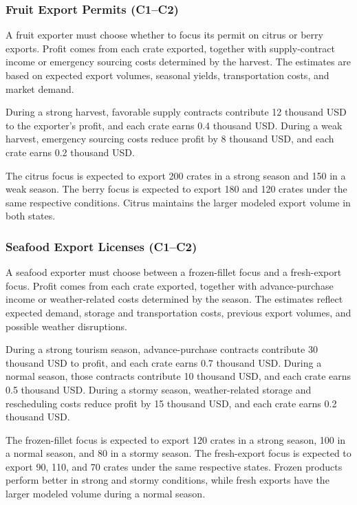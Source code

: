 	\subsubsection{Fruit Export Permits (C1--C2)}
	\label{sec:problem22-fruit-export-permits-c1-c2}
	
	A fruit exporter must choose whether to focus its permit on citrus or berry exports. Profit comes from each crate exported, together with supply-contract income or emergency sourcing costs determined by the harvest. The estimates are based on expected export volumes, seasonal yields, transportation costs, and market demand.
	
	During a strong harvest, favorable supply contracts contribute 12 thousand USD to the exporter’s profit, and each crate earns 0.4 thousand USD. During a weak harvest, emergency sourcing costs reduce profit by 8 thousand USD, and each crate earns 0.2 thousand USD.
	
	The citrus focus is expected to export 200 crates in a strong season and 150 in a weak season. The berry focus is expected to export 180 and 120 crates under the same respective conditions. Citrus maintains the larger modeled export volume in both states.
	
	\subsubsection{Seafood Export Licenses (C1--C2)}
	\label{sec:problem23-seafood-export-licenses-c1-c2}
	
	A seafood exporter must choose between a frozen-fillet focus and a fresh-export focus. Profit comes from each crate exported, together with advance-purchase income or weather-related costs determined by the season. The estimates reflect expected demand, storage and transportation costs, previous export volumes, and possible weather disruptions.
	
	During a strong tourism season, advance-purchase contracts contribute 30 thousand USD to profit, and each crate earns 0.7 thousand USD. During a normal season, those contracts contribute 10 thousand USD, and each crate earns 0.5 thousand USD. During a stormy season, weather-related storage and rescheduling costs reduce profit by 15 thousand USD, and each crate earns 0.2 thousand USD.
	
	The frozen-fillet focus is expected to export 120 crates in a strong season, 100 in a normal season, and 80 in a stormy season. The fresh-export focus is expected to export 90, 110, and 70 crates under the same respective states. Frozen products perform better in strong and stormy conditions, while fresh exports have the larger modeled volume during a normal season.

